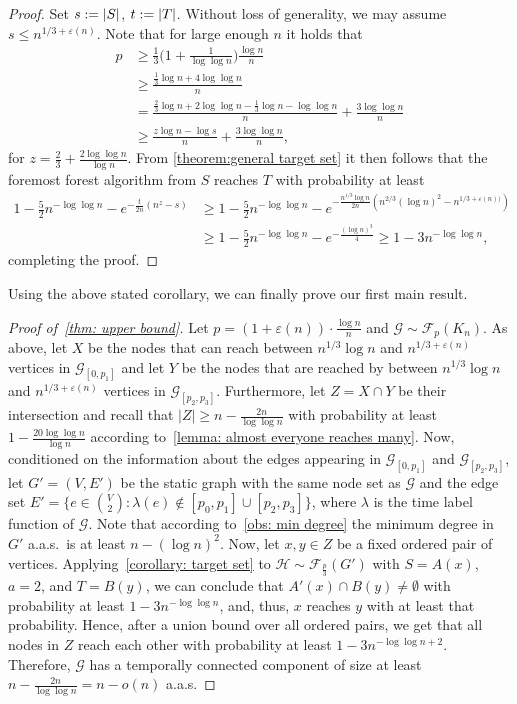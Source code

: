 \documentclass[a4paper,11pt]{article}
\theoremstyle{definition}
\theoremstyle{plain}
\let\eps\varepsilon
\newcommand{\FFF}{\mathcal{F}}
\newcommand{\GGG}{\mathcal{G}}
\newcommand{\HHH}{\mathcal{H}}
\DeclarePairedDelimiter{\abs}{\lvert}{\rvert}
\begin{document}
\begin{proof}
	Set $s := \abs{S}$, $t := \abs{T}$.
	Without loss of generality, we may assume $s \leq n^{1/3 + \eps(n)}$.
	Note that for large enough $n$ it holds that
	\begin{align*}
		p
    &\ge \frac{1}{3}\Big(1+\frac{1}{\log \log n}\Big)\frac{\log n}{n}\\
    &\ge \frac{\frac{1}{3}\log n + 4 \log \log n}{n}\\
    &= \frac{\frac{2}{3}\log n + 2 \log \log n - \frac{1}{3}\log n - \log \log n}{n} + \frac{3\log \log n}{n}\\
    &\ge \frac{z\log n - \log s}{n} + \frac{3\log \log n}{n},
	\end{align*}
  for $z = \frac{2}{3} + \frac{2\log\log n}{\log n}$.
  From \cref{theorem:general target set} it then follows that the foremost forest algorithm from $S$ reaches $T$ with probability at least
  \begin{align*}
    1 - \frac{5}{2} n^{-\log \log n} - e^{-\frac{t}{2n}(n^z - s)}
    &\ge 1 -  \frac{5}{2} n^{-\log \log n} - e^{-\frac{n^{1/3}\log n}{2n}(n^{2/3}(\log n)^2 - n^{1/3 + \eps(n))})}\\
    &\ge 1 -  \frac{5}{2} n^{-\log \log n} - e^{-\frac{(\log n)^3}{4}}
    \ge 1 -3 n^{-\log \log n},
  \end{align*}
  completing the proof.
\end{proof}


Using the above stated corollary, we can finally prove our first main result.
\begin{proof}[Proof of~\cref{thm: upper bound}]
	Let $p= (1+\eps(n))\cdot \frac{\log n}{n}$ and $\GGG \sim \FFF_{p}(K_n)$. As above, let $X$ be the nodes that can reach between $n^{1/3}\log n$ and $n^{1/3 + \eps(n)}$ vertices in $\GGG_{[0, p_{1}]}$ and let $Y$ be the nodes that are reached by between $n^{1/3}\log n$ and $n^{1/3 + \eps(n)}$ vertices in $\GGG_{[p_2, p_{3}]}$.
	Furthermore, let $Z=X\cap Y$ be their intersection and recall that $|Z|\ge n - \frac{2n}{\log \log n}$ with probability at least $1 - \frac{20 \log \log n}{\log n}$ according to~\cref{lemma: almost everyone reaches many}.
	Now, conditioned on the information about the edges appearing in $\GGG_{[0,p_1]}$ and $\GGG_{[p_2, p_3]}$, let $G'=(V, E')$ be the static graph with the same node set as $\GGG$ and the edge set $E'=\{e\in \binom{V}{2}:\lambda(e)\notin [p_0, p_1]\cup [p_2, p_3]\}$, where $\lambda$ is the time label function of $\GGG$.
	Note that according to~\cref{obs: min degree} the minimum degree in $G'$ a.a.s.\ is at least $n - (\log n)^2$.
	Now, let $x,y\in Z$ be a fixed ordered pair of vertices.
	Applying~\cref{corollary: target set} to $\HHH\sim\FFF_{\frac{p}{3}}(G')$ with $S=A(x)$, $a=2$, and $T=B(y)$, we can conclude that $A'(x)\cap B(y)\neq \emptyset$ with probability at least $1 - 3n^{-\log\log n}$, and, thus, $x$ reaches $y$ with at least that probability.
	Hence, after a union bound over all ordered pairs, we get that all nodes in $Z$ reach each other with probability at least $1 - 3n^{-\log\log n + 2}$. Therefore, $\GGG$ has a temporally connected component of size at least $n - \frac{2n}{\log\log n} = n - o(n)$ a.a.s.
	\end{proof}
\end{document}
